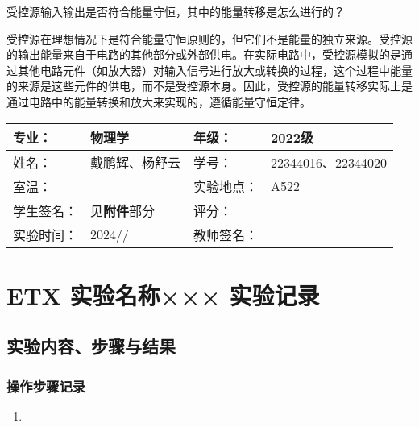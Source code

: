 \documentclass[dvipsnames, svgnames,a4paper,11pt]{article}
\begin{document}
	\begin{question}
		受控源输入输出是否符合能量守恒，其中的能量转移是怎么进行的？
	\end{question}
	受控源在理想情况下是符合能量守恒原则的，但它们不是能量的独立来源。受控源的输出能量来自于电路的其他部分或外部供电。在实际电路中，受控源模拟的是通过其他电路元件（如放大器）对输入信号进行放大或转换的过程，这个过程中能量的来源是这些元件的供电，而不是受控源本身。因此，受控源的能量转移实际上是通过电路中的能量转换和放大来实现的，遵循能量守恒定律。
	
	
	
	
	\clearpage
	
	\begin{table}
		\renewcommand\arraystretch{1.7}
		\centering
		\begin{tabularx}{\textwidth}{|X|X|X|X|}
			\hline
			专业： & 物理学 & 年级： & 2022级 \\
			\hline
			姓名： & 戴鹏辉、杨舒云 & 学号： & 22344016、22344020\\
			\hline
			室温： &  & 实验地点： & A522 \\
			\hline
			学生签名：& 见\textbf{附件}部分 & 评分： &\\
			\hline
			实验时间：& 2024// & 教师签名：&\\
			\hline
		\end{tabularx}
	\end{table}
	
	\section{ETX 实验名称×××  \quad\heiti 实验记录}
	
	\subsection{实验内容、步骤与结果}
	
	\subsubsection{操作步骤记录}
	\begin{enumerate}
		\item 
	\end{enumerate}	
	
\end{document}
